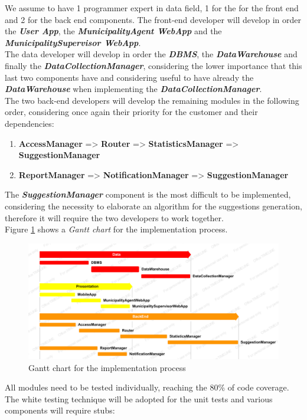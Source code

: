 \documentclass[a4paper]{report}
\begin{document}
We assume to have 1 programmer expert in data field, 1 for the for the front end and 2 for the back end components.
The front-end developer will develop in order the \textbf{\textit{User App}}, the \textbf{\textit{MunicipalityAgent WebApp}} and the \textbf{\textit{MunicipalitySupervisor WebApp}}.\\
The data developer will develop in order the \textbf{\textit{DBMS}}, the \textbf{\textit{DataWarehouse}} and finally the \textbf{\textit{DataCollectionManager}}, considering the lower importance that this last two components have and considering useful to have already the \textbf{\textit{DataWarehouse}} when implementing the \textit{\textbf{DataCollectionManager}}.\\
The two back-end developers will develop the remaining modules in the following order, considering once again their priority for the customer and their dependencies:
\begin{enumerate}[label=\arabic*)]
\item \textbf{AccessManager} => \textbf{Router} => \textbf{StatisticsManager} => \textbf{SuggestionManager}
\item \textbf{ReportManager} => \textbf{NotificationManager}  => \textbf{SuggestionManager}
\end{enumerate}
The \textbf{\textit{SuggestionManager}} component is the most difficult to be implemented, considering the necessity to elaborate an algorithm for the suggestions generation, therefore it will require the two developers to work together.\\
Figure \ref{fig:gantt} shows a \textit{Gantt chart} for the implementation process.\\
\begin{figure}[htp]
\includegraphics[width=\textwidth]{Gantt}
\caption{Gantt chart for the implementation process}
\label{fig:gantt}
\end{figure}
All modules need to be tested individually, reaching the 80\% of code coverage. The white testing technique will be adopted for the unit tests and various components will require stubs:
\end{document}

